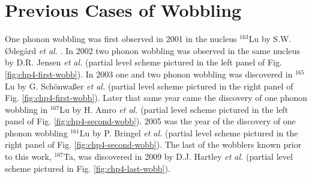 \section{Previous Cases of Wobbling}
\label{sec:trw-prev}
One phonon wobbling was first observed in 2001 in the nucleus $^{163}$Lu by S.W. \O{}deg\aa{}rd \emph{et al.} \cite{wobblingIn163Lu}. In 2002 two phonon wobbling was observed in the same nucleus by D.R. Jensen \emph{et al.} \cite{wobblingIn163LuTwoPhonon} (partial level scheme pictured in the left panel of Fig. \ref{fig:chp4-first-wobb}). In 2003 one and two phonon wobbling was discovered in $^{165}$Lu by G. Sch\"onwa\ss{}er \emph{et al.} \cite{wobblingIn165Lu} (partial level scheme pictured in the right panel of Fig. \ref{fig:chp4-first-wobb}). Later that same year came the discovery of one phonon wobbling in $^{167}$Lu by H. Amro \emph{et al.} \cite{wobblingIn167Lu} (partial level scheme pictured in the left panel of Fig. \ref{fig:chp4-second-wobb}). 2005 was the year of the discovery of one phonon wobbling  $^{161}$Lu by P. Bringel \emph{et al.} \cite{wobblingIn161Lu} (partial level scheme pictured in the right panel of Fig. \ref{fig:chp4-second-wobb}). The last of the wobblers known prior to this work, $^{167}$Ta, was discovered in 2009 by D.J. Hartley \emph{et al.} \cite{wobblingIn167Ta} (partial level scheme pictured in Fig. \ref{fig:chp4-last-wobb}). 

